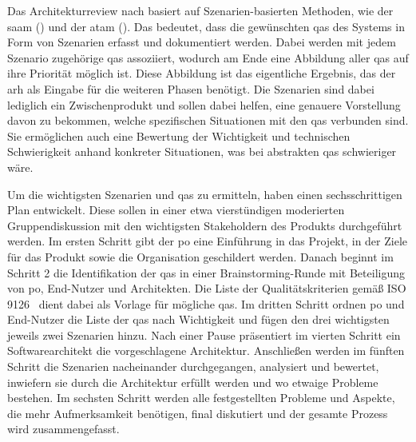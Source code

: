 Das Architekturreview nach  basiert auf Szenarien-basierten Methoden, wie der \gls{saam} () und der \gls{atam} ().
Das bedeutet, dass die gewünschten \glspl{qa} des Systems in Form von Szenarien erfasst und dokumentiert werden.
Dabei werden mit jedem Szenario zugehörige \glspl{qa} assoziiert, wodurch am Ende eine Abbildung aller \glspl{qa} auf ihre Priorität möglich ist.
Diese Abbildung ist das eigentliche Ergebnis, das der \gls{arh} als Eingabe für die weiteren Phasen benötigt.
Die Szenarien sind dabei lediglich ein Zwischenprodukt und sollen dabei helfen, eine genauere Vorstellung davon zu bekommen, welche spezifischen Situationen mit den \glspl{qa} verbunden sind.
Sie ermöglichen auch eine Bewertung der Wichtigkeit und technischen Schwierigkeit anhand konkreter Situationen, was bei abstrakten \glspl{qa} schwieriger wäre.

Um die wichtigsten Szenarien und \glspl{qa} zu ermitteln, haben  einen sechsschrittigen Plan entwickelt.
Diese sollen in einer etwa vierstündigen moderierten Gruppendiskussion mit den wichtigsten Stakeholdern des Produkts durchgeführt werden. 
Im ersten Schritt gibt der \gls{po} eine Einführung in das Projekt, in der Ziele für das Produkt sowie die Organisation geschildert werden.
Danach beginnt im Schritt 2 die Identifikation der \glspl{qa} in einer Brainstorming-Runde mit Beteiligung von \gls{po}, End-Nutzer und Architekten.
Die Liste der Qualitätskriterien gemäß ISO 9126~\cite{ISO-9126}\cite{ISO-9126-b} dient dabei als Vorlage für mögliche \glspl{qa}.
Im dritten Schritt ordnen \gls{po} und End-Nutzer die Liste der \glspl{qa} nach Wichtigkeit und fügen den drei wichtigsten jeweils zwei Szenarien hinzu.
Nach einer Pause präsentiert im vierten Schritt ein Softwarearchitekt die vorgeschlagene Architektur.
Anschließen werden im fünften Schritt die Szenarien nacheinander durchgegangen, analysiert und bewertet, inwiefern sie durch die Architektur erfüllt werden und wo etwaige Probleme bestehen.
Im sechsten Schritt werden alle festgestellten Probleme und Aspekte, die mehr Aufmerksamkeit benötigen, final diskutiert und der gesamte Prozess wird zusammengefasst.


